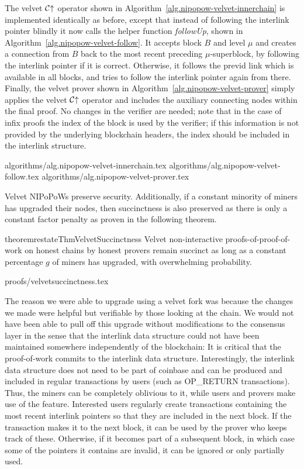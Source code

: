 The velvet $\mathcal{C}\negthickspace\uparrow$ operator shown in
Algorithm~\ref{alg.nipopow-velvet-innerchain} is implemented identically as
before, except that instead of following the interlink pointer blindly it now
calls the helper function \textit{followUp}, shown in
Algorithm~\ref{alg.nipopow-velvet-follow}. It accepts block $B$ and level $\mu$
and creates a connection from $B$ back to the most recent preceding
$\mu$-superblock, by following the interlink pointer if it is correct.
Otherwise, it follows the previd link which is available in all blocks, and
tries to follow the interlink pointer again from there. Finally, the velvet
prover shown in Algorithm~\ref{alg.nipopow-velvet-prover} simply applies the
velvet $\mathcal{C}\negthickspace\uparrow$ operator and includes the auxiliary connecting nodes
within the final proof. No changes in the verifier are needed; note that  in the
case of infix proofs the $\mathrm{index}$ of the block is used by the verifier;
if this information is not provided by the underlying blockchain headers, the
index should be included in the interlink structure.

{algorithms/alg.nipopow-velvet-innerchain.tex}
{algorithms/alg.nipopow-velvet-follow.tex}
{algorithms/alg.nipopow-velvet-prover.tex}

Velvet NIPoPoWs preserve security. Additionally, if a constant minority of
miners has upgraded their nodes, then succinctness is also preserved
as there is only a constant factor penalty as proven in the following theorem.

\begin{restatable}{theorem}{restateThmVelvetSuccinctness}
    \label{thm.velvet-succinctness}
    Velvet non-interactive proofs-of-proof-of-work on honest chains by honest
    provers remain succinct as long as a constant percentage $g$ of miners has
    upgraded, with overwhelming probability.
\end{restatable}
{proofs/velvetsuccinctness.tex}

The reason we were able to upgrade using a velvet fork was because the changes
we made were helpful but verifiable by those looking at the chain. We would not
have been able to pull off this upgrade without modifications to the consensus
layer in the sense that the interlink data structure could not have been
maintained somewhere independently of the blockchain: It is critical that the
proof-of-work commits to the interlink data structure. Interestingly, the
interlink data structure does not need to be part of coinbase and can be
produced and included in regular transactions by users (such as OP\_RETURN
transactions). Thus, the miners can be completely oblivious to it, while users
and provers make use of the feature. Interested users regularly create
transactions containing the most recent interlink pointers so that they are
included in the next block. If the transaction makes it to the next block, it
can be used by the prover who keeps track of these. Otherwise, if it becomes
part of a subsequent block, in which case some of the pointers it contains are
invalid, it can be ignored or only partially used.

